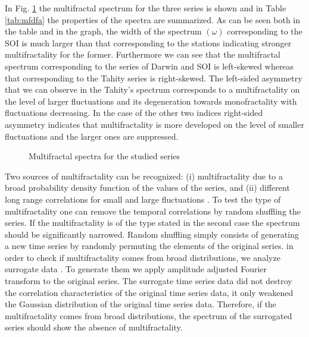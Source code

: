 \documentclass[onecolumn, preprint,aps,amsmath, amssymb, superscriptaddress]{revtex4}
\begin{document}
In Fig. \ref{fig:spectrum} the multifractal spectrum for the three series is shown and in Table \ref{tab:mfdfa} the properties of the spectra are summarized. As can be seen both in the table and in the graph, the width of the spectrum $(\omega)$ corresponding to the SOI is much larger than that corresponding to the stations indicating stronger multifractality for the former. Furthermore we can see that the multifractal spectrum corresponding to the series of Darwin and SOI is left-skewed whereas that corresponding to the Tahity series is right-skewed. The left-sided asymmetry that we can observe in the Tahity's spectrum corresponds to a  multifractality on the level of larger fluctuations and its degeneration towards monofractality with fluctuations decreasing. In the case of the other two indices right-sided asymmetry indicates that multifractality is more developed on the level of smaller fluctuations and the larger ones are suppressed.


\begin{figure}
\caption{Multifractal spectra for the studied series}
\label{fig:spectrum}
\end{figure}



Two sources of multifractality can be recognized: (i) multifractality due to a broad probability density function of the values of the series, and (ii) different long range correlations for small and large fluctuations \cite{Kantelhardt}. To test the type of multifractality one can remove the temporal correlations by random shuffling the series. If the multifractality is of the type stated in the second case the spectrum should be significantly narrowed. Random shuffling simply consists of generating a new time series by randomly permuting the elements of the original series. in order to check if multifractality comes from broad distributions, we analyze surrogate data \cite{Theiler}. To generate them we apply amplitude adjusted Fourier transform to the original series. The surrogate time series data did not destroy the correlation characteristics of the original time series data, it only weakened the Gaussian distribution of the original time series data. Therefore, if the multifractality comes from broad distributions, the spectrum of the surrogated series should show the absence of multifractality. %
\end{document}
